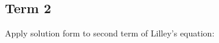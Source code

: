 \documentclass[]{aiaa-tc}%
\begin{document}


\subsection{Term 2}

Apply solution form to second term of Lilley's equation:
\end{document}
